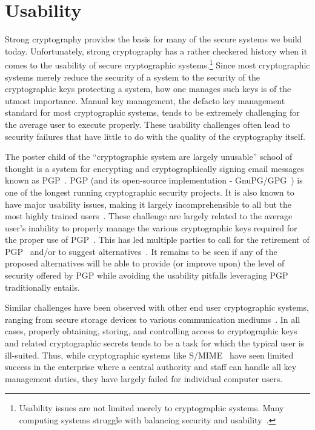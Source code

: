 \section{Usability}
\label{chap:background:usability}

Strong cryptography provides the basis for many of the secure systems
we build today. Unfortunately, strong cryptography has a rather
checkered history when it comes to the usability of secure
cryptographic systems.\footnote{Usability issues are not limited
  merely to cryptographic systems. Many computing systems struggle
  with balancing security and usability~\cite{furnell2006,
    ibrahim2010}.} Since most cryptographic systems merely reduce the
security of a system to the security of the cryptographic keys
protecting a system, how one manages such keys is of the utmost
importance. Manual key management, the defacto key management
standard for most cryptographic systems, tends to be extremely
challenging for the average user to execute properly. These usability
challenges often lead to security failures that have little to do with
the quality of the cryptography itself.

The poster child of the ``cryptographic system are largely unusable''
school of thought is a system for encrypting and cryptographically
signing email messages known as PGP~\cite{callas2007}. PGP (and its
open-source implementation - GnuPG/GPG~\cite{gnupg}) is one of the
longest running cryptographic security projects. It is also known to
have major usability issues, making it largely incomprehensible to all
but the most highly trained users~\cite{whitten1999}. These challenge
are largely related to the average user's inability to properly manage
the various cryptographic keys required for the proper use of
PGP~\cite{green-challenge}. This has led multiple parties to call for
the retirement of PGP~\cite{green-pgp} and/or to suggest
alternatives~\cite{borisov2004, mailpile, openwhisper,
  google-endtoend}. It remains to be seen if any of the proposed
alternatives will be able to provide (or improve upon) the level of
security offered by PGP while avoiding the usability pitfalls
leveraging PGP traditionally entails.

Similar challenges have been observed with other end user
cryptographic systems, ranging from secure storage devices to various
communication mediums~\cite{sweikata2009}. In all cases, properly
obtaining, storing, and controlling access to cryptographic keys and
related cryptographic secrets tends to be a task for which the typical
user is ill-suited. Thus, while cryptographic systems like
S/MIME~\cite{ramsdell-rfc5751} have seen limited success in the
enterprise where a central authority and staff can handle all key
management duties, they have largely failed for individual computer
users.

